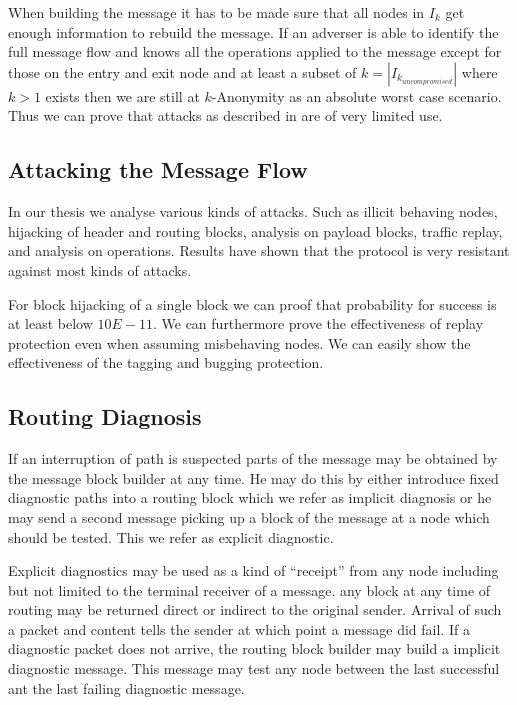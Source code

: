 \documentclass[9pt,journal,compsoc]{IEEEtran}
\begin{document}
When building the message it has to be made sure that all nodes in $I_k$ get enough information to rebuild the message. If an adverser is able to identify the full message flow and knows all the operations applied to the message except for those on the entry and exit node and at least a subset of $k=|I_{k_{uncompromised}}|$ where $k>1$ exists then we are still at $k$-Anonymity as an absolute worst case scenario. Thus we can prove that attacks as described in \cite{DanSer04} are of very limited use.

\subsection{Attacking the Message Flow}
In our thesis\cite{messageVortex} we analyse various kinds of attacks. Such as illicit behaving nodes, hijacking of header and routing blocks, analysis on payload blocks, traffic replay, and analysis on operations. Results have shown that the protocol is very resistant against most kinds of attacks.

For block hijacking of a single block we can proof that probability for success is at least below $10E-11$. We can furthermore prove the effectiveness of replay protection even when assuming misbehaving nodes. We can easily show the effectiveness of the tagging and bugging protection. 

\subsection{Routing Diagnosis}
If an interruption of path is suspected parts of the message may be obtained by the message block builder at any time. He may do this by either introduce fixed diagnostic paths into a routing block which we refer as implicit diagnosis or he may send a second message picking up a block of the message at a node which should be tested. This we refer as explicit diagnostic.

Explicit diagnostics may be used as a kind of ``receipt'' from any node including but not limited to the terminal receiver of a message. any block at any time of routing may be returned direct or indirect to the original sender. Arrival of such a packet and content tells the sender at which point a message did fail. If a diagnostic packet does not arrive, the routing block builder may build a implicit diagnostic message. This message may test any node between the last successful ant the last failing diagnostic message.
\end{document}
